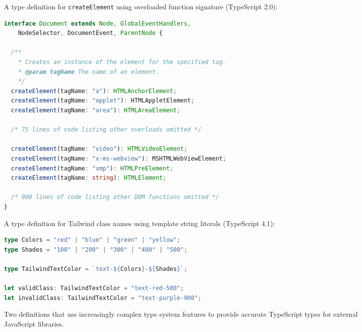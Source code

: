 \begin{figure}[t]
\noindent
A type definition for \texttt{createElement} using overloaded function signature (TypeScript 2.0):

\begin{addmargin}[2em]{0em}
\begin{lstlisting}[language=ts]
interface Document extends Node, GlobalEventHandlers,
    NodeSelector, DocumentEvent, ParentNode {

  /**
    * Creates an instance of the element for the specified tag.
    * @param tagName The name of an element.
    */
  createElement(tagName: "a"): HTMLAnchorElement;
  createElement(tagName: "applet"): HTMLAppletElement;
  createElement(tagName: "area"): HTMLAreaElement;

  /* 75 lines of code listing other overloads omitted */

  createElement(tagName: "video"): HTMLVideoElement;
  createElement(tagName: "x-ms-webview"): MSHTMLWebViewElement;
  createElement(tagName: "xmp"): HTMLPreElement;
  createElement(tagName: string): HTMLElement;

  /* 900 lines of code listing other DOM functions omitted */
}
\end{lstlisting}
\end{addmargin}

\noindent
A type definition for Tailwind class names using template string literals (TypeScript 4.1):

\begin{addmargin}[2em]{0em}
\begin{lstlisting}[language=ts]
type Colors = "red" | "blue" | "green" | "yellow";
type Shades = "100" | "200" | "300" | "400" | "500";

type TailwindTextColor = `text-${Colors}-${Shades}`;

let validClass: TailwindTextColor = "text-red-500";
let invalidClass: TailwindTextColor = "text-purple-900";
\end{lstlisting}
\end{addmargin}

\caption{Two definitions that use increasingly complex type system features to provide
  accurate TypeScript types for external JavaScript libraries.}
\label{fig:tstypes}
\end{figure}

